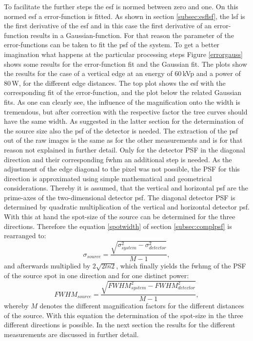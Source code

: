 To facilitate the further steps the \gls{esf} is normed between zero and one. On this normed \gls{esf} a error-function is fitted. As shown in section \ref{subsec:esflsf}, the \gls{lsf} is the first derivative of the \gls{esf} and in this case the first derivative of an error-function results in a Gaussian-function. For that reason the parameter of the error-functions can be taken to fit the \gls{psf} of the system. To get a better imagination what happens at the particular processing steps Figure \ref{errorgauss} shows some results for the error-function fit and the Gaussian fit. The plots show the results for the case of a vertical edge at an energy of $60\,$kVp and a power of $80\,$W, for the different edge distances. The top plot shows the \gls{esf} with the corresponding fit of the error-function, and the plot below the related Gaussian fits. As one can clearly see, the influence of the magnification onto the width is tremendous, but after correction with the respective factor the tree curves should have the same width. As suggested in the latter section for the determination of the source size also the \gls{psf} of the detector is needed. The extraction of the \gls{psf} out of the raw images is the same as for the other measurements and is for that reason not explained in further detail. Only for the detector PSF in the diagonal direction and their corresponding \gls{fwhm} an additional step is needed. As the adjustment of the edge diagonal to the pixel was not possible, the PSF for this direction is approximated using simple mathematical and geometrical considerations. Thereby it is assumed, that the vertical and horizontal \gls{psf} are the prime-axes of the two-dimensional detector \gls{psf}. The diagonal detector PSF is determined by quadratic multiplication of the vertical and horizontal detector \gls{psf}.   With this at hand the spot-size of the source can be determined for the three directions. Therefore the equation \ref{spotwidth} of section \ref{subsec:complpsf} is rearranged to:
\begin{equation}
\sigma_{source} = \frac{\sqrt{\sigma_{system}^{2}-\sigma_{detector}^{2}}}{M-1},
\end{equation}
and afterwards multiplied by $2\sqrt{2 ln2}$, which finally yields the \gls{fwhmg} of the PSF of the source spot in one direction and for one distinct power:
\begin{equation}\label{sourcedet}
FWHM_{source} = \frac{\sqrt{FWHM_{system}^{2}-FWHM_{detector}^{2}}}{M-1},
\end{equation}
whereby $M$ denotes the different magnification factors for the different distances of the source. With this equation the determination of the spot-size in the three different directions is possible. In the next section the results for the different measurements are discussed in further detail.      
